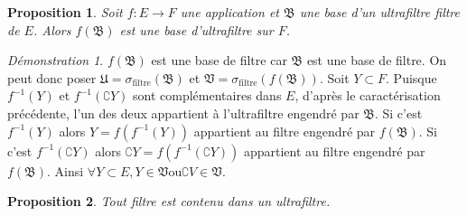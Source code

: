 \documentclass[a4paper, 11pt, french]{book}
\theoremstyle{plain} %
\newtheorem{proposition}{Proposition}
\theoremstyle{definition} %
\theoremstyle{remark} %
\newtheorem*{demonstration}{Démonstration}
\newcommand{\1}{\mathds{1}}
\newcommand{\inv}[1]{#1^{-1}}
\newcommand{\ou}{\mathrel{\mathrm{ou}}}
\renewcommand{\frak}[1]{\mathfrak{#1}}
\newcommand{\rm}[1]{\mathrm{#1}}
\begin{document}
\begin{proposition}
	Soit $f:E\rightarrow F$ une application et $\frak{B}$ une base d'un ultrafiltre filtre de $E$.
	Alors $f(\frak{B})$ est une base d'ultrafiltre sur $F$.
\end{proposition}

\begin{demonstration}
	$f(\frak{B})$ est une base de filtre car $\frak{B}$ est une base de filtre.
	On peut donc poser $\frak{U}=\sigma_\rm{filtre}(\frak{B})$ et $\frak{V}=\sigma_\rm{filtre}(f(\frak{B}))$.
	Soit $Y\subset F$.
	Puisque $\inv{f}(Y)$ et $\inv{f}(\complement Y)$ sont complémentaires dans $E$, d'après le caractérisation précédente, l'un des deux appartient à l'ultrafiltre engendré par $\frak{B}$.
	Si c'est $\inv{f}(Y)$ alors $Y=f(\inv{f}(Y))$ appartient au filtre engendré par $f(\frak{B})$.
	Si c'est $\inv{f}(\complement Y)$ alors $\complement Y=f(\inv{f}(\complement Y))$ appartient au filtre engendré par $f(\frak{B})$.
	Ainsi $\forall Y\subset E, Y\in\frak{V}\ou\complement V\in\frak{V}$.
\end{demonstration}

\begin{proposition}
	Tout filtre est contenu dans un ultrafiltre.
\end{proposition}
\end{document}
